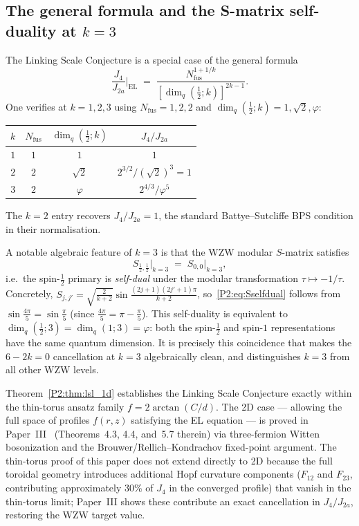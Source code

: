 \documentclass[11pt,a4paper]{article}
\newcommand{\vp}{\varphi}
\newcommand{\Ja}{J_{2a}}
\newcommand{\Jfour}{J_{4}}
\theoremstyle{remark}
\begin{document}
\subsection{The general formula and the S-matrix self-duality at $k=3$}
\label{P2:sec:general}

The Linking Scale Conjecture is a special case of the general formula
\begin{equation}
  \frac{\Jfour}{\Ja}\bigg|_{\mathrm{EL}}
  \;=\; \frac{N_{\mathrm{fus}}^{1+1/k}}{[\dim_q(\tfrac{1}{2};k)]^{2k-1}}.
  \label{P2:eq:general_J4J2a}
\end{equation}
One verifies at $k=1,2,3$ using $N_{\mathrm{fus}}=1,2,2$ and
$\dim_q(\frac{1}{2};k) = 1, \sqrt{2}, \vp$:
\begin{center}
\begin{tabular}{cccc}
\toprule
$k$ & $N_{\mathrm{fus}}$ & $\dim_q(\tfrac{1}{2};k)$ & $\Jfour/\Ja$ \\
\midrule
$1$ & $1$ & $1$        & $1$ \\
$2$ & $2$ & $\sqrt{2}$ & $2^{3/2}/({\sqrt{2}})^3 = 1$ \\
$3$ & $2$ & $\vp$      & $2^{4/3}/\vp^5$ \\
\bottomrule
\end{tabular}
\end{center}
The $k=2$ entry recovers $\Jfour/\Ja=1$, the standard
Battye--Sutcliffe BPS condition in their normalisation.

A notable algebraic feature of $k=3$ is that the WZW modular
$S$-matrix satisfies
\begin{equation}
  S_{\frac{1}{2},\frac{1}{2}}\big|_{k=3}
  \;=\; S_{0,0}\big|_{k=3},
  \label{P2:eq:Sselfdual}
\end{equation}
i.e.\ the spin-$\frac{1}{2}$ primary is \emph{self-dual} under
the modular transformation $\tau\mapsto -1/\tau$.  Concretely,
$S_{j,j'} = \sqrt{\tfrac{2}{k+2}}\sin\tfrac{(2j+1)(2j'+1)\pi}{k+2}$,
so~\eqref{P2:eq:Sselfdual} follows from
$\sin\tfrac{4\pi}{5}=\sin\tfrac{\pi}{5}$ (since
$\tfrac{4\pi}{5}=\pi-\tfrac{\pi}{5}$).
This self-duality is equivalent to
$\dim_q(\tfrac{1}{2};3)=\dim_q(1;3)=\vp$: both the spin-$\tfrac{1}{2}$
and spin-$1$ representations have the same quantum dimension.
It is precisely this coincidence that makes the $6-2k=0$ cancellation
at $k=3$ algebraically clean, and distinguishes $k=3$ from all
other WZW levels.

Theorem~\ref{P2:thm:lsl_1d} establishes the Linking Scale Conjecture
exactly within the thin-torus ansatz family $f=2\arctan(C/d)$.
The 2D case --- allowing the full space of profiles $f(r,z)$ satisfying
the EL equation --- is proved in Paper~III~\cite{Paper3}
(Theorems~4.3, 4.4, and~5.7 therein) via three-fermion Witten
bosonization and the Brouwer/Rellich--Kondrachov fixed-point argument.
The thin-torus proof of this paper does not extend directly to 2D because
the full toroidal geometry introduces additional Hopf curvature
components ($F_{12}$ and $F_{23}$, contributing approximately 30\%
of $\Jfour$ in the converged profile) that vanish in the thin-torus
limit; Paper~III shows these contribute an exact cancellation in
$J_4/J_{2a}$, restoring the WZW target value.
\end{document}
